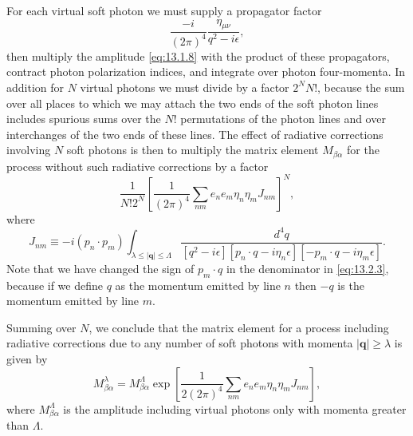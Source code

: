 For each virtual soft photon we must supply a propagator factor
\begin{equation}
  \frac{-i}{(2\pi)^4}\frac{\eta_{\mu\nu}}{q^2-i\epsilon},
  \tag{13.2.1}\label{eq:13.2.1}
\end{equation}
then multiply the amplitude \eqref{eq:13.1.8} with the product of these
propagators, contract photon polarization indices, and integrate over photon
four-momenta. In addition for $N$ virtual photons we must divide by a factor
$2^N N!$, because the sum over all places to which we may attach the
two ends of the soft photon lines includes spurious sums over the $N!$
permutations of the photon lines and over interchanges of the two ends
of these lines. The effect of radiative corrections involving $N$ soft photons
is then to multiply the matrix element $M_{\beta\alpha}$ for the process without such
radiative corrections by a factor
\begin{equation}
  \frac{1}{N!2^N}
  \left[\frac{1}{(2\pi)^4}\sum_{nm}e_n e_m\eta_n\eta_m J_{nm}\right]^N,
  \tag{13.2.2}\label{eq:13.2.2}
\end{equation}
where
\begin{equation}
  J_{nm}\equiv-i(p_n\cdot p_m)
  \int_{\lambda\leq|\mathbf q|\leq\Lambda}
  \frac{d^4q}{[q^2-i\epsilon][p_n\cdot q-i\eta_n\epsilon]
  [-p_m\cdot q-i\eta_m\epsilon]}.
  \tag{13.2.3}\label{eq:13.2.3}
\end{equation}
Note that we have changed the sign of $p_m\cdot q$ in the denominator in
\eqref{eq:13.2.3},
because if we define $q$ as the momentum emitted by line $n$ then $-q$ is the
momentum emitted by line $m$.

Summing over $N$, we conclude that the matrix element for a process
including radiative corrections due to any number of soft photons with
momenta $|\mathbf q|\geq\lambda$ is given by
\begin{equation}
  M^\lambda_{\beta\alpha}=M^\Lambda_{\beta\alpha}
  \exp\left[\frac{1}{2(2\pi)^4}
  \sum_{nm}e_n e_m\eta_n\eta_m J_{nm}\right],
  \tag{13.2.4}\label{eq:13.2.4}
\end{equation}
where $M^\Lambda_{\beta\alpha}$ is the amplitude including virtual photons only with momenta
greater than $\Lambda$.

